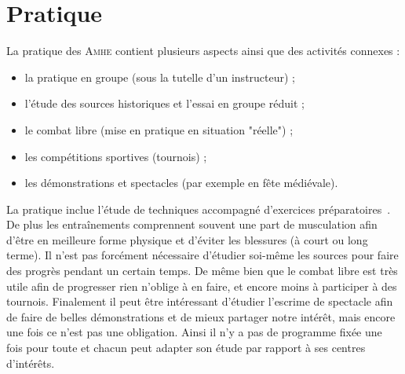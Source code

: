 


\section{Pratique}


\noindent
La pratique des \textsc{Amhe} contient plusieurs aspects ainsi que des activités connexes :
\begin{itemize}
	\item la pratique en groupe (sous la tutelle d'un instructeur) ;
	\item l'étude des sources historiques et l'essai en groupe réduit ;
	\item le combat libre (mise en pratique en situation "réelle") ;
	\item les compétitions sportives (tournois) ;
	\item les démonstrations et spectacles (par exemple en fête médiévale).
\end{itemize}
La pratique inclue l'étude de techniques accompagné d'exercices préparatoires~\footnotemark{}.%
De plus les entraînements comprennent souvent une part de musculation afin d'être en meilleure forme physique et d'éviter les blessures (à court ou long terme).
Il n'est pas forcément nécessaire d'étudier soi-même les sources pour faire des progrès pendant un certain temps.
De même bien que le combat libre est très utile afin de progresser rien n'oblige à en faire, et encore moins à participer à des tournois.
Finalement il peut être intéressant d'étudier l'escrime de spectacle afin de faire de belles démonstrations et de mieux partager notre intérêt, mais encore une fois ce n'est pas une obligation.
Ainsi il n'y a pas de programme fixée une fois pour toute et chacun peut adapter son étude par rapport à ses centres d'intérêts.


